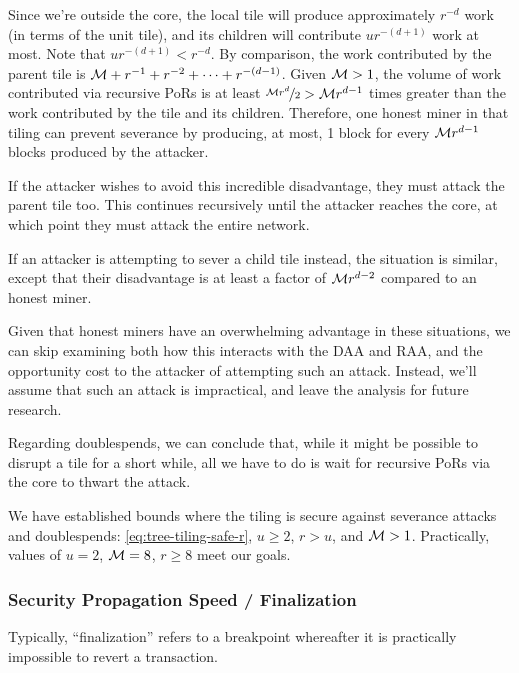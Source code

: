 Since we're outside the core, the local tile will produce approximately $r^{-d}$ work (in terms of the unit tile), and its children will contribute $ur^{-(d+1)}$ work at most.
Note that $ur^{-(d+1)} < r^{-d}$.
By comparison, the work contributed by the parent tile is $\mathcal{M} + r^{-1} + r^{-2} + \cdots + r^{-(d-1)}$.
Given $\mathcal{M} > 1$, the volume of work contributed via recursive PoRs is at least $\nicefrac{\mathcal{M} r^d}{2} > \mathcal{M} r^{d-1}$ times greater than the work contributed by the tile and its children.
Therefore, one honest miner in that tiling can prevent severance by producing, at most, 1 block for every $\mathcal{M} r^{d-1}$ blocks produced by the attacker.

If the attacker wishes to avoid this incredible disadvantage, they must attack the parent tile too.
This continues recursively until the attacker reaches the core, at which point they must attack the entire network.

If an attacker is attempting to sever a child tile instead, the situation is similar, except that their disadvantage is at least a factor of $\mathcal{M} r^{d-2}$ compared to an honest miner.

Given that honest miners have an overwhelming advantage in these situations, we can skip examining both how this interacts with the DAA and RAA, and the opportunity cost to the attacker of attempting such an attack.
Instead, we'll assume that such an attack is impractical, and leave the analysis for future research.

Regarding doublespends, we can conclude that, while it might be possible to disrupt a tile for a short while, all we have to do is wait for recursive PoRs via the core to thwart the attack.


We have established bounds where the tiling is secure against severance attacks and doublespends: \autoref{eq:tree-tiling-safe-r}, $u \ge 2$, $r > u$, and $\mathcal{M} > 1$.
Practically, values of $u = 2$, $\mathcal{M} = 8$, $r \ge 8$ meet our goals.

\subsubsection{Security Propagation Speed / Finalization}
\label{sec:tiling-security-propagation}

Typically, ``finalization'' refers to a breakpoint whereafter it is practically impossible to revert a transaction.

